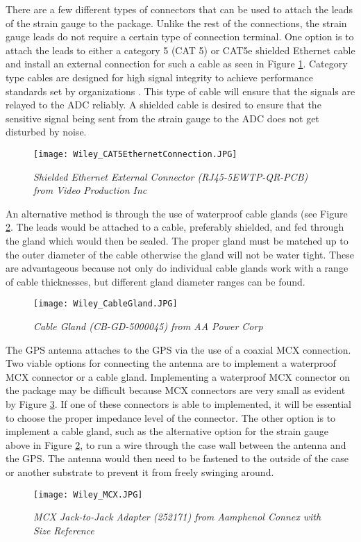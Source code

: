 There are a few different types of connectors that can be used to attach the leads of the strain gauge to the package. Unlike the rest of the
connections, the strain gauge leads do not require a certain type of connection terminal. One option is to attach the leads to either a category 5 (CAT
5) or CAT5e shielded Ethernet cable and install an external connection for such a cable as seen in Figure \ref{fig:CAT5}. Category type cables are
designed for high signal integrity to achieve performance standards set by organizations \cite{gareis2003surfaced}. This type of cable will ensure that the signals are relayed to the ADC reliably. A shielded cable is desired to
ensure that the sensitive signal being sent from the strain gauge to the ADC does not get disturbed by noise. 
\begin{figure}[h]
\centering
\texttt{[image: Wiley\_CAT5EthernetConnection.JPG]}
\caption{\textit{Shielded Ethernet External Connector (RJ45-5EWTP-QR-PCB) from Video Production Inc}}
\label{fig:CAT5}
\end{figure}

An alternative method is through the use of waterproof cable glands (see Figure \ref{fig:Cable Gland}. The leads would be attached to a cable, preferably
shielded, and fed through the gland which would then be sealed. The proper gland must be matched up to the outer diameter of the cable otherwise the
gland will not be water tight. These are advantageous because not only do individual cable glands work with a range of cable thicknesses, but different
gland diameter ranges can be found. 
\begin{figure}[ht]
\centering
\texttt{[image: Wiley\_CableGland.JPG]}
\caption{\textit{Cable Gland (CB-GD-5000045) from AA Power Corp}}
\label{fig:Cable Gland}
\end{figure}


The GPS antenna attaches to the GPS via the use of a coaxial MCX connection. Two viable options for connecting the antenna are to implement a waterproof
MCX connector or a cable gland. Implementing a waterproof MCX connector on the package may be difficult because MCX connectors are very small as evident
by Figure \ref{fig:MCX}. If one of these connectors is able to implemented, it will be essential to choose the proper impedance level of the
connector. The other option is to implement a cable gland, such as the alternative option for the strain gauge above in Figure \ref{fig:Cable Gland},
to run a wire through the case wall between the antenna and the GPS. The antenna would then need to be fastened to the outside of the case or another
substrate to prevent it from freely swinging around. 
\begin{figure}[ht]
\centering
\texttt{[image: Wiley\_MCX.JPG]}
\caption{\textit{MCX Jack-to-Jack Adapter (252171) from Aamphenol Connex with Size Reference}}
\label{fig:MCX}
\end{figure}


